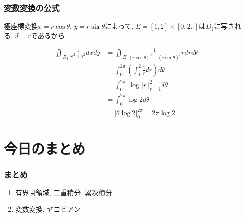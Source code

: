 
\begin{frame}
\frametitle{変数変換の公式}

極座標変換$x=r \cos \theta$, $y=r \sin \theta$によって, $E= [1,2] \times [0, 2\pi]$は$D_2$に写される. 
$J=r$であるから

\begin{align*}
\iint_{D_2} \frac{1}{x^2+y^2}dxdy & = \iint_E \frac{1}{(r \cos \theta)^2+(r\sin \theta)^2}r dr d \theta \\
& = \int_0^{2\pi} (\int_1^2 \frac{1}{r}dr) d\theta \\
& = \int_0^{2\pi} \big[ \log|r| \big]_{r=1}^{2}d\theta \\
& = \int_0^{2\pi} \log 2 d\theta \\
& = \big[\theta \log 2\big]_0^{2\pi} = 2\pi \log 2. 
\end{align*}


\end{frame}







\section{今日のまとめ}
\begin{frame}
\frametitle{まとめ}   


\begin{enumerate}
\item 有界閉領域, 二重積分, 累次積分
\item 変数変換, ヤコビアン
\end{enumerate} 

\end{frame}
